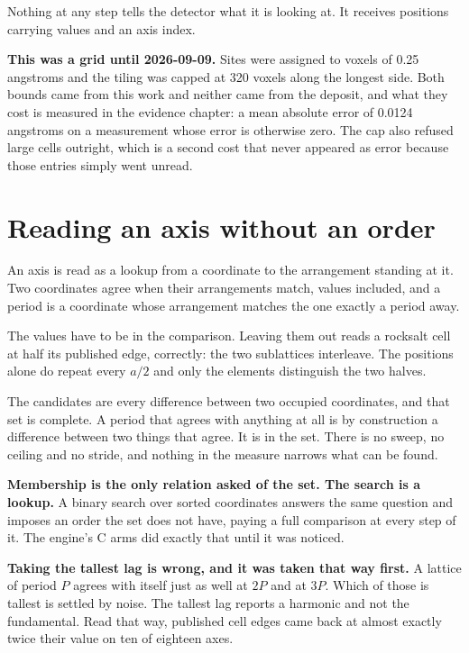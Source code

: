 Nothing at any step tells the detector what it is looking at. It receives positions carrying values and an axis index.

\textbf{This was a grid until 2026-09-09.} Sites were assigned to voxels of 0.25 angstroms and the tiling was capped at 320 voxels along the longest side. Both bounds came from this work and neither came from the deposit, and what they cost is measured in the evidence chapter: a mean absolute error of 0.0124 angstroms on a measurement whose error is otherwise zero. The cap also refused large cells outright, which is a second cost that never appeared as error because those entries simply went unread.

\section{Reading an axis without an order}

An axis is read as a lookup from a coordinate to the arrangement standing at it. Two coordinates agree when their arrangements match, values included, and a period is a coordinate whose arrangement matches the one exactly a period away.

The values have to be in the comparison. Leaving them out reads a rocksalt cell at half its published edge, correctly: the two sublattices interleave. The positions alone do repeat every $a/2$ and only the elements distinguish the two halves.

The candidates are every difference between two occupied coordinates, and that set is complete. A period that agrees with anything at all is by construction a difference between two things that agree. It is in the set. There is no sweep, no ceiling and no stride, and nothing in the measure narrows what can be found.

\textbf{Membership is the only relation asked of the set. The search is a lookup.} A binary search over sorted coordinates answers the same question and imposes an order the set does not have, paying a full comparison at every step of it. The engine's C arms did exactly that until it was noticed.

\textbf{Taking the tallest lag is wrong, and it was taken that way first.} A lattice of period $P$ agrees with itself just as well at $2P$ and at $3P$. Which of those is tallest is settled by noise. The tallest lag reports a harmonic and not the fundamental. Read that way, published cell edges came back at almost exactly twice their value on ten of eighteen axes.

